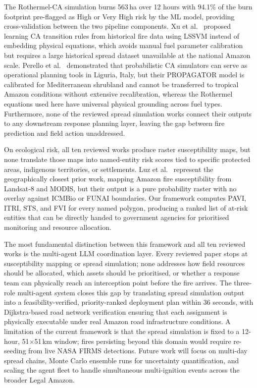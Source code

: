 \documentclass[12pt,a4paper]{article}
\begin{document}
The Rothermel-CA simulation burns 563\,ha over 12 hours with 94.1\% of the burn footprint pre-flagged as High or Very High risk by the ML model, providing cross-validation between the two pipeline components. Xu et al.~\cite{xu2022} proposed learning CA transition rules from historical fire data using LSSVM instead of embedding physical equations, which avoids manual fuel parameter calibration but requires a large historical spread dataset unavailable at the national Amazon scale. Perello et al.~\cite{perello2024} demonstrated that probabilistic CA simulators can serve as operational planning tools in Liguria, Italy, but their PROPAGATOR model is calibrated for Mediterranean shrubland and cannot be transferred to tropical Amazon conditions without extensive recalibration, whereas the Rothermel equations used here have universal physical grounding across fuel types. Furthermore, none of the reviewed spread simulation works connect their outputs to any downstream response planning layer, leaving the gap between fire prediction and field action unaddressed.

On ecological risk, all ten reviewed works produce raster susceptibility maps, but none translate those maps into named-entity risk scores tied to specific protected areas, indigenous territories, or settlements. Luz et al.~\cite{luz2022} represent the geographically closest prior work, mapping Amazon fire susceptibility from Landsat-8 and MODIS, but their output is a pure probability raster with no overlay against ICMBio or FUNAI boundaries. Our framework computes PAVI, ITRI, STS, and FVI for every named polygon, producing a ranked list of at-risk entities that can be directly handed to government agencies for prioritised monitoring and resource allocation.

The most fundamental distinction between this framework and all ten reviewed works is the multi-agent LLM coordination layer. Every reviewed paper stops at susceptibility mapping or spread simulation; none addresses how field resources should be allocated, which assets should be prioritised, or whether a response team can physically reach an interception point before the fire arrives. The three-role multi-agent system closes this gap by translating spread simulation output into a feasibility-verified, priority-ranked deployment plan within 36 seconds, with Dijkstra-based road network verification ensuring that each assignment is physically executable under real Amazon road infrastructure conditions. A limitation of the current framework is that the spread simulation is fixed to a 12-hour, 51$\times$51\,km window; fires persisting beyond this domain would require re-seeding from live NASA FIRMS detections. Future work will focus on multi-day spread chains, Monte Carlo ensemble runs for uncertainty quantification, and scaling the agent fleet to handle simultaneous multi-ignition events across the broader Legal Amazon.
\end{document}
